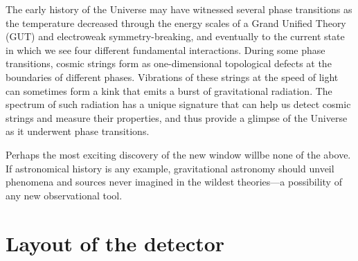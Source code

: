 The early history of the Universe may have witnessed several phase transitions as the temperature decreased through the energy scales of a Grand Unified Theory (GUT) and electroweak symmetry-breaking, and eventually to the current state in which we see four different fundamental interactions. During some phase transitions, cosmic strings form as one-dimensional topological defects at the boundaries of different phases. Vibrations of these strings at the speed of light can sometimes form a kink that emits a burst of gravitational radiation. The spectrum of such radiation has a unique signature that can help us detect cosmic strings and measure their properties, and thus provide a glimpse of the Universe as it underwent phase transitions.

Perhaps the most exciting discovery of the new window willbe none of the above. If astronomical history is any example, gravitational astronomy should unveil phenomena and sources never imagined in the wildest theories---a possibility of any new observational tool.


\FloatBarrier
\newpage
\section{Layout of the detector}

